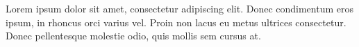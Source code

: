 \documentclass[../../memoria.tex]{subfiles}
\begin{document}
Lorem ipsum dolor sit amet, consectetur adipiscing elit. Donec condimentum eros ipsum, in rhoncus orci varius
vel. Proin non lacus eu metus ultrices consectetur. Donec pellentesque molestie odio, quis mollis sem cursus at.
\end{document}
